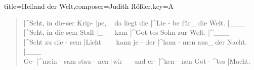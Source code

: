 \documentclass[]{leadsheet}
\begin{document}
\begin{song}{title={Heiland der Welt},composer={Judith Rößler},key={A}}
\begin{verse}
|^Seht, in die-ser Krip- |pe, \eighthrest~ 
da liegt die |^Lie - be für\_ die Welt. |\_\_\_ \quarterrest~ \\
|^Seht, in die-sem Stall |\_ \eighthrest~\halfrest~ kam 
|^Got-tes Sohn zur Welt. |^\_\_\_ \quarterrest~ \\
|^Seht zu die - sem |Licht \eighthrest~\eighthrest~\eighthrest~ kann 
je - der |^kom - men aus\_ der Nacht. |\_\_\_ \\
Ge- |^mein - sam stau - nen |wir \eighthrest~\eighthrest~ 
und er- |^ken - nen Got - ^tes |Macht. 
\end{verse}

\end{song}
\end{document}
